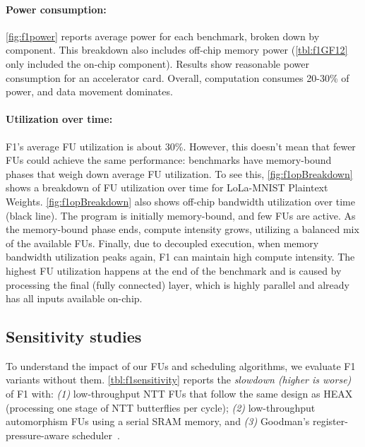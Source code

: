 \figFOneDataMovement
\figFOneOpBreakdown

\paragraph{Power consumption:}
\autoref{fig:f1power} reports average power for each benchmark, broken down by
component. This breakdown also includes off-chip memory power
(\autoref{tbl:f1GF12} only included the on-chip component). Results show
reasonable power consumption for an accelerator card. Overall, computation
consumes 20-30\% of power, and data movement dominates.

\paragraph{Utilization over time:}
F1's average FU utilization is about 30\%. However, this doesn't mean that
fewer FUs could achieve the same performance: benchmarks have memory\hyp{}bound
phases that weigh down average FU utilization. To see this,
\autoref{fig:f1opBreakdown} shows a breakdown of FU utilization over time for
LoLa-MNIST Plaintext Weights. \autoref{fig:f1opBreakdown} also shows off-chip
bandwidth utilization over time (black line). The program is initially
memory-bound, and few FUs are active. As the memory-bound phase ends, compute
intensity grows, utilizing a balanced mix of the available FUs. Finally, due to
decoupled execution, when memory bandwidth utilization peaks again, F1 can
maintain high compute intensity. The highest FU utilization happens at the end
of the benchmark and is caused by processing the final (fully connected) layer,
which is highly parallel and already has all inputs available on-chip.

\subsection{Sensitivity studies}
\label{sec:sensitivity}

\tblFOneSensitivity

To understand the impact of our FUs and scheduling algorithms, we evaluate F1
variants without them. \autoref{tbl:f1sensitivity} reports the \emph{slowdown
(higher is worse)} of F1 with: \emph{(1)} low\hyp{}throughput NTT FUs that
follow the same design as HEAX (processing one stage of NTT butterflies per
cycle); \emph{(2)} low\hyp{}throughput automorphism FUs using a serial SRAM
memory, and \emph{(3)} Goodman's register-pressure-aware
scheduler~\cite{goodman:ics1988:code}.

